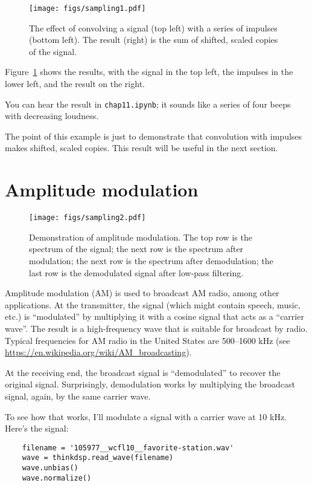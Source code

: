 \begin{figure}
	\centerline{\texttt{[image: figs/sampling1.pdf]}}
	\caption{The effect of convolving a signal (top left) with a series of
		impulses (bottom left).  The result (right) is the sum of shifted,
		scaled copies of the signal.}
	\label{fig.sampling1}
\end{figure}

Figure~\ref{fig.sampling1} shows the results, with the signal in
the top left, the impulses in the lower left, and the result on
the right.

You can hear the result in {\tt chap11.ipynb}; it sounds like
a series of four beeps with decreasing loudness.

The point of this example is just to demonstrate that convolution
with impulses makes shifted, scaled copies.  This result will be
useful in the next section.


\section{Amplitude modulation}
\label{am}

\begin{figure}
	\centerline{\texttt{[image: figs/sampling2.pdf]}}
	\caption{Demonstration of amplitude modulation.  The top row is the
		spectrum of the signal; the next row is the spectrum after modulation;
		the next row is the spectrum after demodulation; the last row is the
		demodulated signal after low-pass filtering.}
	\label{fig.sampling2}
\end{figure}

Amplitude modulation (AM) is used to broadcast AM radio, among other
applications.  At the transmitter, the signal (which might contain
speech, music, etc.) is ``modulated'' by multiplying it with a cosine
signal that acts as a ``carrier wave''.  The result is a
high-frequency wave that is suitable for broadcast by radio.  Typical
frequencies for AM radio in the United States are 500--1600 kHz (see
\url{https://en.wikipedia.org/wiki/AM_broadcasting}).

At the receiving end, the broadcast signal is ``demodulated'' to
recover the original signal.  Surprisingly, demodulation works by
multiplying the broadcast signal, again, by the same carrier wave.

To see how that works, I'll modulate a signal with a carrier wave at
10 kHz.  Here's the signal:

\begin{verbatim}
	filename = '105977__wcfl10__favorite-station.wav'
	wave = thinkdsp.read_wave(filename)
	wave.unbias()
	wave.normalize()
\end{verbatim}

